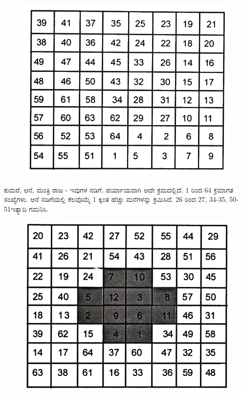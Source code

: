 \begin{figure}[H]
\includegraphics{src/figures/chap6/fig6.13.jpg}
\end{figure}

ಕುದುರೆ, ಆನೆ, ಮಂತ್ರಿ ರಾಜ - ಇವುಗಳ ನಡಿಗೆ. ಪರ್ಯಾಯವಾಗಿ ಅದೇ ಕ್ರಮದಲ್ಲಿದೆ. 1 ರಿಂದ 64 ಕ್ರಮಾಗತ ಸಂಖ್ಯೆಗಳು. ಆನೆ ನಡಿಗೆಯಲ್ಲಿ ಕೆಲವೊಮ್ಮೆ 1 ಕ್ಕಿಂತ ಹೆಚ್ಚು ಮನೆಗಳನ್ನು ಕ್ರಮಿಸಿದೆ. 26 ರಿಂದ 27, 34-35, 50-51ಇತ್ಯಾದಿ ಗಮನಿಸಿ.
\begin{figure}[H]
\includegraphics{src/figures/chap6/fig6.14.jpg}
\end{figure}

